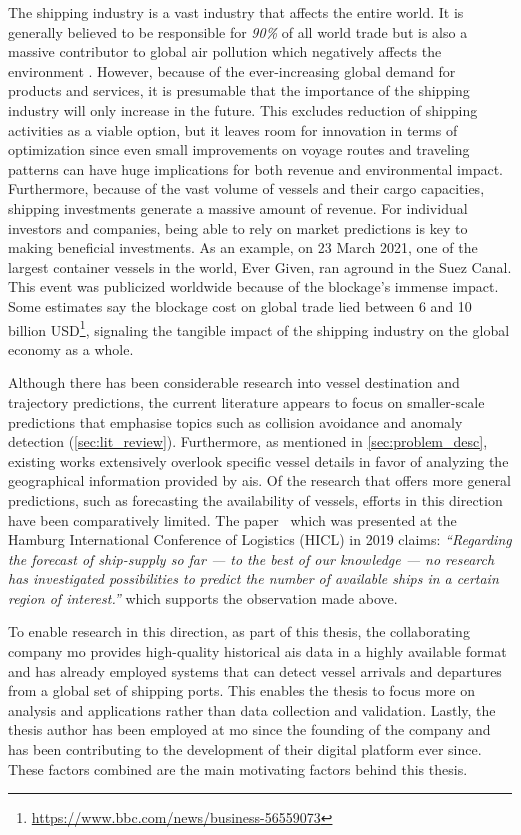 The shipping industry is a vast industry that affects the entire world. It is generally believed to be responsible for \textit{90\%} of all world trade \parencite{maritime_studies@2011} but is also a massive contributor to global air pollution which negatively affects the environment \parencite{zheng2016:online}. However, because of the ever-increasing global demand for products and services, it is presumable that the importance of the shipping industry will only increase in the future. This excludes reduction of shipping activities as a viable option, but it leaves room for innovation in terms of optimization since even small improvements on voyage routes and traveling patterns can have huge implications for both revenue and environmental impact. Furthermore, because of the vast volume of vessels and their cargo capacities, shipping investments generate a massive amount of revenue. For individual investors and companies, being able to rely on market predictions is key to making beneficial investments. As an example, on 23 March 2021, one of the largest container vessels in the world, Ever Given, ran aground in the Suez Canal. This event was publicized worldwide because of the blockage's immense impact. Some estimates say the blockage cost on global trade lied between 6 and 10 billion USD\footnote{\url{https://www.bbc.com/news/business-56559073}}, signaling the tangible impact of the shipping industry on the global economy as a whole.

Although there has been considerable research into vessel destination and trajectory predictions, the current literature appears to focus on smaller-scale predictions that emphasise topics such as collision avoidance and anomaly detection (\cref{sec:lit_review}). Furthermore, as mentioned in \cref{sec:problem_desc}, existing works extensively overlook specific vessel details in favor of analyzing the geographical information provided by \acrshort{ais}. Of the research that offers more general predictions, such as forecasting the availability of vessels, efforts in this direction have been comparatively limited. The paper~\cite{lechtenberg2019} which was presented at the Hamburg International Conference of Logistics (HICL) in 2019 claims: \textit{“Regarding the forecast of ship-supply so far --- to the best of our knowledge --- no research has investigated possibilities to predict the number of available ships in a certain region of interest.”} which supports the observation made above.

To enable research in this direction, as part of this thesis, the collaborating company \acrfull{mo} provides high-quality historical \acrshort{ais} data in a highly available format and has already employed systems that can detect vessel arrivals and departures from a global set of shipping ports. This enables the thesis to focus more on analysis and applications rather than data collection and validation. Lastly, the thesis author has been employed at \acrshort{mo} since the founding of the company and has been contributing to the development of their digital platform ever since. These factors combined are the main motivating factors behind this thesis.

